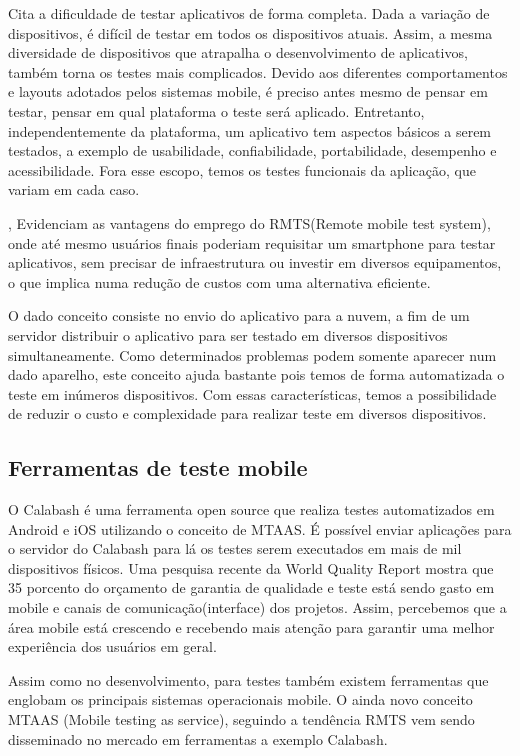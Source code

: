 \cite{6248786} Cita a dificuldade de testar aplicativos de forma completa. Dada a variação de dispositivos, é difícil de testar em todos os dispositivos atuais. Assim, a mesma  diversidade de dispositivos que atrapalha o desenvolvimento de aplicativos, também torna os testes mais complicados. Devido aos diferentes comportamentos e layouts adotados pelos sistemas mobile, é preciso antes mesmo de pensar em testar, pensar em qual plataforma o teste será aplicado. Entretanto, independentemente da plataforma, um aplicativo tem aspectos básicos a serem testados, a exemplo de usabilidade, confiabilidade, portabilidade, desempenho e acessibilidade. Fora esse escopo, temos os testes funcionais da aplicação, que variam em cada caso.


\cite{Huang-2012}, Evidenciam as vantagens do emprego do RMTS(Remote mobile test system), onde até mesmo usuários finais poderiam requisitar um smartphone para testar aplicativos, sem precisar de infraestrutura ou investir em diversos equipamentos, o que implica numa redução de custos com uma alternativa eficiente. 


O dado conceito consiste no envio do aplicativo para a nuvem, a fim de um servidor distribuir o aplicativo para ser testado em diversos dispositivos simultaneamente. Como determinados problemas podem somente aparecer num dado aparelho, este conceito ajuda bastante pois temos de forma automatizada o teste em inúmeros dispositivos. Com essas características, temos a possibilidade de reduzir o custo e complexidade para realizar teste em diversos dispositivos.


\subsection{Ferramentas de teste mobile}\label{sub_sec:ferramentas_teste}


O Calabash é uma ferramenta open source que realiza testes automatizados em Android e iOS utilizando o conceito de MTAAS. É possível enviar aplicações para o servidor do Calabash para lá os testes serem executados em mais de mil dispositivos físicos. 
Uma pesquisa recente da World Quality Report mostra que 35 porcento do orçamento de garantia de qualidade e teste está sendo gasto em mobile e canais de comunicação(interface) dos projetos. Assim, percebemos que a área mobile está crescendo e recebendo mais atenção para garantir uma melhor experiência dos usuários em geral.

Assim como no desenvolvimento, para testes também existem ferramentas que englobam os principais sistemas operacionais mobile. O ainda novo conceito  MTAAS (Mobile testing as service), seguindo a tendência RMTS vem sendo disseminado no mercado em ferramentas a exemplo Calabash.


